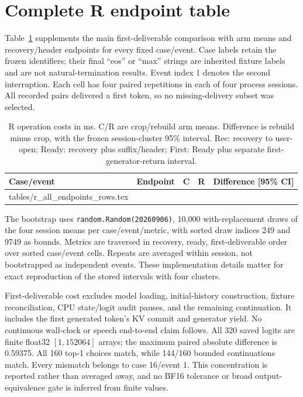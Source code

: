 \documentclass[12pt]{article}
\makeatletter
\newcommand{\tableinput}[1]{\@@input #1 }
\makeatother
\begin{document}
\section{Complete R endpoint table}
\label{sec:s-r}

Table~\ref{tab:s-r} supplements the main first-deliverable comparison with arm means and recovery/header endpoints for every fixed case/event. Case labels retain the frozen identifiers; their final ``eos'' or ``max'' strings are inherited fixture labels and are not natural-termination results. Event index 1 denotes the second interruption. Each cell has four paired repetitions in each of four process sessions. All recorded pairs delivered a first token, so no missing-delivery subset was selected.

\begin{table}[p]
\centering\small
\caption{R operation costs in ms. C/R are crop/rebuild arm means. Difference is rebuild minus crop, with the frozen session-cluster 95\% interval. Rec: recovery to user-open; Ready: recovery plus suffix/header; First: Ready plus separate first-generator-return interval.}\label{tab:s-r}
\begin{tabular}{@{}llrrr@{}}
\toprule
Case/event & Endpoint & C & R & Difference [95\% CI] \\
\midrule
\tableinput{tables/r_all_endpoints_rows.tex}
\bottomrule
\end{tabular}
\end{table}

The bootstrap uses \texttt{random.Random(20260906)}, 10,000 with-replacement draws of the four session means per case/event/metric, with sorted draw indices 249 and 9749 as bounds. Metrics are traversed in recovery, ready, first-deliverable order over sorted case/event cells. Repeats are averaged within session, not bootstrapped as independent events. These implementation details matter for exact reproduction of the stored intervals with four clusters.

First-deliverable cost excludes model loading, initial-history construction, fixture reconciliation, CPU state/logit audit pauses, and the remaining continuation. It includes the first generated token's KV commit and generator yield. No continuous wall-clock or speech end-to-end claim follows. All 320 saved logits are finite float32 $[1,152064]$ arrays; the maximum paired absolute difference is 0.59375. All 160 top-1 choices match, while 144/160 bounded continuations match. Every mismatch belongs to case 16/event 1. This concentration is reported rather than averaged away, and no BF16 tolerance or broad output-equivalence gate is inferred from finite values.

\clearpage


\end{document}
